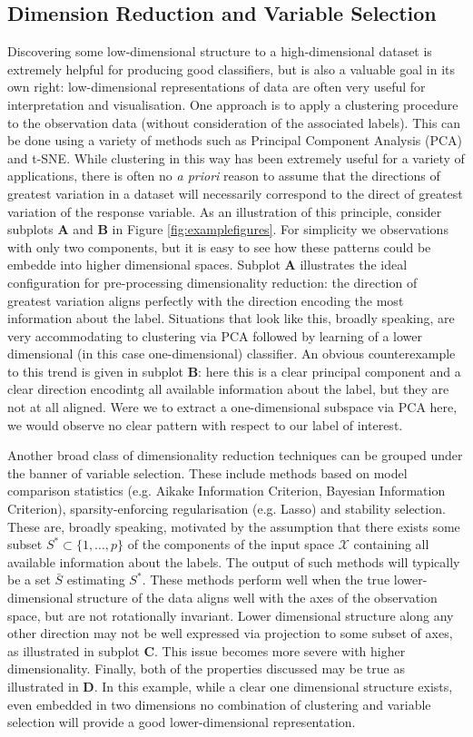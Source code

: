\documentclass[12pt]{article}
\begin{document}
\subsection{Dimension Reduction and Variable Selection}
Discovering some low-dimensional structure to a high-dimensional dataset is extremely helpful for producing good classifiers, but is also a valuable goal in its own right: low-dimensional representations of data are often very useful for interpretation and visualisation. One approach is to apply a clustering procedure to the observation data (without consideration of the associated labels). This can be done using a variety of methods such as Principal Component Analysis (PCA) and t-SNE. While clustering in this way has been extremely useful for a variety of applications, there is often no \textit{a priori} reason to assume that the directions of greatest variation in a dataset will necessarily correspond to the direct of greatest variation of the response variable. As an illustration of this principle, consider subplots \textbf{A} and \textbf{B} in Figure \ref{fig:examplefigures}. For simplicity we observations with only two components, but it is easy to see how these patterns could be embedde into higher dimensional spaces. Subplot \textbf{A} illustrates the ideal configuration for pre-processing dimensionality reduction: the direction of greatest variation aligns perfectly with the direction encoding the most information about the label. Situations that look like this, broadly speaking, are very accommodating to clustering via PCA followed by learning of a lower dimensional (in this case one-dimensional) classifier. An obvious counterexample to this trend is given in subplot \textbf{B}: here this is a clear principal component and a clear direction encodintg all available information about the label, but they are not at all aligned. Were we to extract a one-dimensional subspace via PCA here, we would observe no clear pattern with respect to our label of interest. 

Another broad class of dimensionality reduction techniques can be grouped under the banner of variable selection. These include methods based on model comparison statistics (e.g. Aikake Information Criterion, Bayesian Information Criterion), sparsity-enforcing regularisation (e.g. Lasso) and stability selection. These are, broadly speaking, motivated by the assumption that there exists some subset $S^* \subset \{1,\dots,p\}$ of the components of the input space $\mathcal{X}$ containing all available information about the labels. The output of such methods will typically be a set $\bar{S}$ estimating $S^*$. These methods perform well when the true lower-dimensional structure of the data aligns well with the axes of the observation space, but are not rotationally invariant. Lower dimensional structure along any other direction may not be well expressed via projection to some subset of axes, as illustrated in subplot $\textbf{C}$. This issue becomes more severe with higher dimensionality. Finally, both of the properties discussed may be true as illustrated in \textbf{D}. In this example, while a clear one dimensional structure exists, even embedded in two dimensions no combination of clustering and variable selection will provide a good lower-dimensional representation. 
\end{document}
